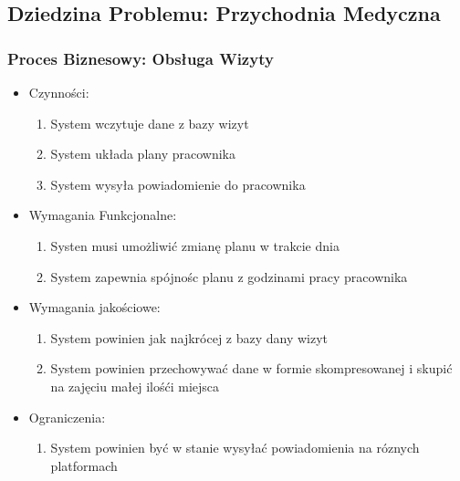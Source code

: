 \documentclass{article}
\begin{document}
	\subsection*{Dziedzina Problemu: Przychodnia Medyczna}
	\subsubsection*{Proces Biznesowy: Obsługa Wizyty}
	\begin{itemize}
		\item Czynności:
			\begin{enumerate}
				\item System wczytuje dane z bazy wizyt
				\item System układa plany pracownika
				\item System wysyła powiadomienie do pracownika
			\end{enumerate}
		\item Wymagania Funkcjonalne:
			\begin{enumerate}
				\item Systen musi umożliwić zmianę planu w trakcie dnia
				\item System zapewnia spójnośc planu z godzinami pracy pracownika
			\end{enumerate}
		\item Wymagania jakościowe:
			\begin{enumerate}
				\item System powinien jak najkrócej z bazy dany wizyt
				\item System powinien przechowywać dane w formie skompresowanej i skupić na zajęciu małej ilośći miejsca
			\end{enumerate}
		\item Ograniczenia:
			\begin{enumerate}
				\item System powinien być w stanie wysyłać powiadomienia na róznych platformach
			\end{enumerate}
	\end{itemize}
\end{document}
